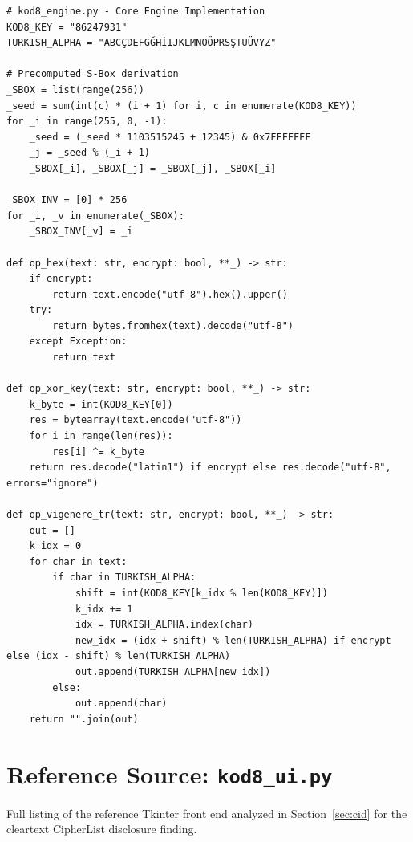 \documentclass[11pt]{article}
\begin{document}
\begin{lstlisting}[style=appendixcode]
# kod8_engine.py - Core Engine Implementation
KOD8_KEY = "86247931"
TURKISH_ALPHA = "ABCÇDEFGĞHİIJKLMNOÖPRSŞTUÜVYZ"

# Precomputed S-Box derivation
_SBOX = list(range(256))
_seed = sum(int(c) * (i + 1) for i, c in enumerate(KOD8_KEY))
for _i in range(255, 0, -1):
    _seed = (_seed * 1103515245 + 12345) & 0x7FFFFFFF
    _j = _seed % (_i + 1)
    _SBOX[_i], _SBOX[_j] = _SBOX[_j], _SBOX[_i]

_SBOX_INV = [0] * 256
for _i, _v in enumerate(_SBOX):
    _SBOX_INV[_v] = _i

def op_hex(text: str, encrypt: bool, **_) -> str:
    if encrypt:
        return text.encode("utf-8").hex().upper()
    try:
        return bytes.fromhex(text).decode("utf-8")
    except Exception:
        return text

def op_xor_key(text: str, encrypt: bool, **_) -> str:
    k_byte = int(KOD8_KEY[0])
    res = bytearray(text.encode("utf-8"))
    for i in range(len(res)):
        res[i] ^= k_byte
    return res.decode("latin1") if encrypt else res.decode("utf-8", errors="ignore")

def op_vigenere_tr(text: str, encrypt: bool, **_) -> str:
    out = []
    k_idx = 0
    for char in text:
        if char in TURKISH_ALPHA:
            shift = int(KOD8_KEY[k_idx % len(KOD8_KEY)])
            k_idx += 1
            idx = TURKISH_ALPHA.index(char)
            new_idx = (idx + shift) % len(TURKISH_ALPHA) if encrypt else (idx - shift) % len(TURKISH_ALPHA)
            out.append(TURKISH_ALPHA[new_idx])
        else:
            out.append(char)
    return "".join(out)
\end{lstlisting}

\newpage
\section{Reference Source: \texttt{kod8\_ui.py}}
\label{app:ui}

Full listing of the reference Tkinter front end analyzed in
Section~\ref{sec:cid} for the cleartext CipherList disclosure finding.
\end{document}
